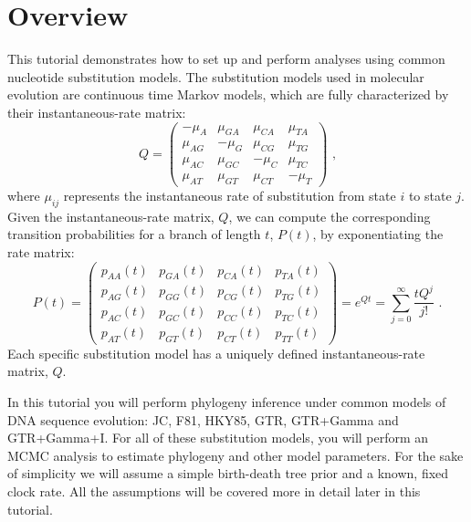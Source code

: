 \section{Overview}


This tutorial demonstrates how to set up and perform analyses using common nucleotide substitution models. 
The substitution models used in molecular evolution are continuous time Markov models, which are fully characterized by their instantaneous-rate matrix:
\begin{equation*}
Q = \begin{pmatrix} -\mu_A & \mu_{GA} & \mu_{CA} & \mu_{TA} \\
\mu_{AG} & -\mu_G  & \mu_{CG} & \mu_{TG} \\
\mu_{AC} & \mu_{GC} & -\mu_C  & \mu_{TC} \\
\mu_{AT} & \mu_{GT} & \mu_{CT} & -\mu_T 
\end{pmatrix} \mbox{  ,}
\end{equation*}
where $\mu_{ij}$ represents the instantaneous rate of substitution from state $i$ to state $j$. Given the instantaneous-rate matrix, $Q$, we can compute the corresponding transition probabilities for a branch of length $t$, $P(t)$, by exponentiating the rate matrix:
\begin{equation*}
P(t) = \begin{pmatrix}          
p_{AA}(t) & p_{GA}(t) & p_{CA}(t) & p_{TA}(t) \\
p_{AG}(t) & p_{GG}(t) & p_{CG}(t) & p_{TG}(t) \\
p_{AC}(t) & p_{GC}(t) & p_{CC}(t) & p_{TC}(t) \\
p_{AT}(t) & p_{GT}(t) & p_{CT}(t) & p_{TT}(t)
\end{pmatrix} = e^{Qt} = \sum_{j=0}^\infty\frac{tQ^j}{j!} \mbox{  .}
\end{equation*}
Each specific substitution model has a uniquely defined instantaneous-rate matrix, $Q$.


In this tutorial you will perform phylogeny inference under common models of DNA sequence evolution: JC, F81, HKY85, GTR, GTR+Gamma and GTR+Gamma+I.
For all of these substitution models, you will perform an MCMC analysis to estimate phylogeny and other model parameters.
For the sake of simplicity we will assume a simple birth-death tree prior and a known, fixed clock rate.
All the assumptions will be covered more in detail later in this tutorial.

